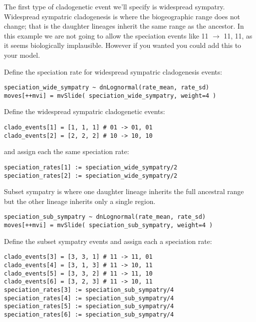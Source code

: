The first type of cladogenetic event we'll specify is widespread sympatry.
Widespread sympatric cladogenesis is where the biogeographic range does
not change; that is the daughter lineages inherit the same range as
the ancestor. In this example we are not going to allow the speciation events like
11 $\rightarrow$ 11, 11, as it seems biologically implausible. However if you wanted 
you could add this to your model.

Define the speciation rate for widespread sympatric cladogenesis events:
{\tt \begin{snugshade*}
\begin{lstlisting}
speciation_wide_sympatry ~ dnLognormal(rate_mean, rate_sd)
moves[++mvi] = mvSlide( speciation_wide_sympatry, weight=4 )
\end{lstlisting}
\end{snugshade*}}

Define the widespread sympatric cladogenetic events:
{\tt \begin{snugshade*}
\begin{lstlisting}
clado_events[1] = [1, 1, 1] # 01 -> 01, 01
clado_events[2] = [2, 2, 2] # 10 -> 10, 10
\end{lstlisting}
\end{snugshade*}}

and assign each the same speciation rate:
{\tt \begin{snugshade*}
\begin{lstlisting}
speciation_rates[1] := speciation_wide_sympatry/2
speciation_rates[2] := speciation_wide_sympatry/2
\end{lstlisting}
\end{snugshade*}}

Subset sympatry is where one daughter lineage inherits the full
ancestral range but the other lineage inherits only a single region.
{\tt \begin{snugshade*}
\begin{lstlisting}
speciation_sub_sympatry ~ dnLognormal(rate_mean, rate_sd)
moves[++mvi] = mvSlide( speciation_sub_sympatry, weight=4 )
\end{lstlisting}
\end{snugshade*}}

Define the subset sympatry events and assign each a speciation rate:
{\tt \begin{snugshade*}
\begin{lstlisting}
clado_events[3] = [3, 3, 1] # 11 -> 11, 01 
clado_events[4] = [3, 1, 3] # 11 -> 10, 11
clado_events[5] = [3, 3, 2] # 11 -> 11, 10
clado_events[6] = [3, 2, 3] # 11 -> 10, 11
speciation_rates[3] := speciation_sub_sympatry/4
speciation_rates[4] := speciation_sub_sympatry/4
speciation_rates[5] := speciation_sub_sympatry/4
speciation_rates[6] := speciation_sub_sympatry/4
\end{lstlisting}
\end{snugshade*}}

